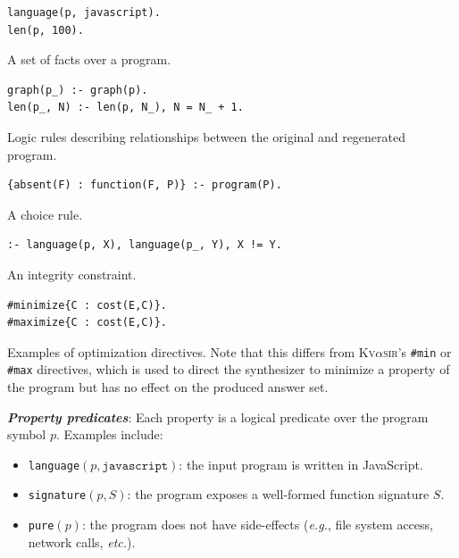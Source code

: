 \documentclass[nonacm,sigplan,review]{acmart}
\def\eg{{\em e.g.}, }
\def\etc{{\em etc.}\xspace}
\newcommand{\sys}{{\scshape Kv{$\alpha$}sir}\xspace}
\newcommand{\heading}[1]{\vspace{2pt}\noindent\textbf{\emph{#1}}:\enspace}
\begin{document}
\begin{listing}
\begin{verbatim}
language(p, javascript).
len(p, 100).
\end{verbatim}
\caption{A set of facts over a program.}
\label{lst:terms}
\end{listing}

\begin{listing}
\begin{verbatim}
graph(p_) :- graph(p).
len(p_, N) :- len(p, N_), N = N_ + 1.
\end{verbatim}
\caption{Logic rules describing relationships between the original and regenerated program.}
\label{lst:rules}
\end{listing}

\begin{listing}
\begin{verbatim}
{absent(F) : function(F, P)} :- program(P).
\end{verbatim}
\caption{A choice rule.}
\label{lst:choice}
\end{listing}

\begin{listing}
\begin{verbatim}
:- language(p, X), language(p_, Y), X != Y.
\end{verbatim}
\caption{An integrity constraint.}
\label{lst:constraint}
\end{listing}

\begin{listing}
\begin{verbatim}
#minimize{C : cost(E,C)}.
#maximize{C : cost(E,C)}.
\end{verbatim}
\caption{Examples of optimization directives. Note that this differs from \sys's \texttt{\#min} or \texttt{\#max} directives, which is used to direct the synthesizer to minimize a property of the program but has no effect on the produced answer set.}
\label{lst:optimization}
\end{listing}




\heading{Property predicates}
Each property is a logical predicate over the program symbol $p$. Examples include:
\begin{itemize}
  \item \texttt{language}$(p, \texttt{javascript})$: the input program is written in JavaScript.
  \item \texttt{signature}$(p, S)$: the program exposes a well-formed function signature $S$.
  \item \texttt{pure}$(p)$: the program does not have side-effects (\eg file system access, network calls, \etc).
\end{itemize}
\end{document}
